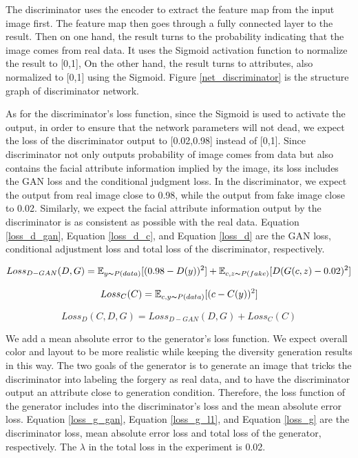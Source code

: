 The discriminator uses the encoder to extract the feature map from the input image first. The feature map then goes through a fully connected layer to the result.
Then on one hand,  the result turns to the probability indicating that the image comes from real data. It uses the Sigmoid activation function to normalize the result to [0,1],
On the other hand, the result turns to attributes, also normalized to [0,1] using the Sigmoid.
Figure \ref{net_discriminator} is the structure graph of discriminator network.

As for the discriminator's loss function, since the Sigmoid is used to activate the output,
    in order to ensure that the network parameters will not dead,
    we expect the loss of the discriminator output to [0.02,0.98] instead of [0,1].
Since discriminator not only outputs probability of image comes from data but also contains the facial attribute information implied by the image,
    its loss includes the GAN loss and the conditional judgment loss.
In the discriminator, we expect the output from real image close to 0.98, while the output from fake image close to 0.02.
Similarly, we expect the facial attribute information output by the discriminator is as consistent as possible with the real data.
Equation \eqref{loss_d_gan}, Equation \eqref{loss_d_c}, and Equation \eqref{loss_d} are the GAN loss,
    conditional adjustment loss and total loss of the discriminator, respectively.

\begin{equation}
    Loss_{D-GAN}(D,G)=
    \mathbb{E}_{y\thicksim P(data)}[(0.98-D(y))^2]+
    \mathbb{E}_{c,z\thicksim P(fake)}[D(G(c,z)-0.02)^2]
    \label{loss_d_gan}
\end{equation}


\begin{equation}
    Loss_{C}(C)=
    \mathbb{E}_{c,y\thicksim P(data)}[(c-C(y))^2]
    \label{loss_d_c}
\end{equation}

\begin{equation}
    Loss_{D}(C,D,G)=
    Loss_{D-GAN}(D,G)+
    Loss_{C}(C)
    \label{loss_d}
\end{equation}

We add a mean absolute error to the generator's loss function.
We expect overall color and layout to be more realistic while keeping the diversity generation results in this way.
The two goals of the generator is to generate an image that tricks the discriminator into labeling the forgery as real data,
    and to have the discriminator output an attribute close to generation condition.
Therefore, the loss function of the generator includes into the discriminator's loss and the mean absolute error loss.
Equation \eqref{loss_g_gan}, Equation \eqref{loss_g_l1}, and Equation \eqref{loss_g} are the discriminator loss,
    mean absolute error loss and total loss of the generator, respectively.
The $\lambda$ in the total loss in the experiment is 0.02.

